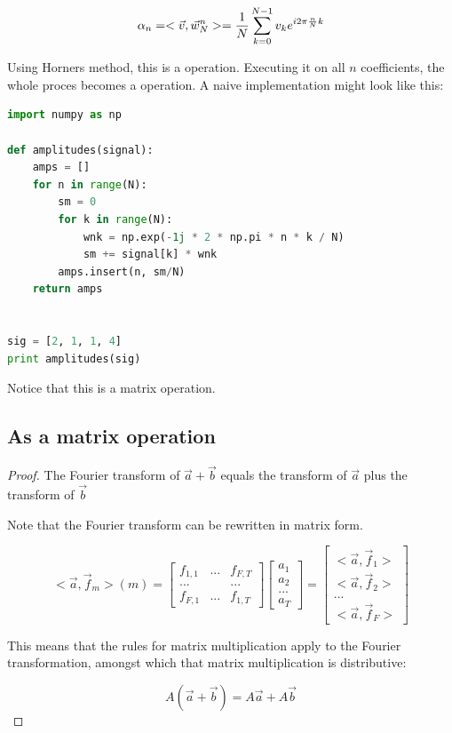 $$ \alpha_n = < \vec{v} , \vec{w}_N^n > = \frac{1}{N} \sum_{k=0}^{N-1} v_k e^{i 2\pi \frac{n}{N} k} $$

Using Horners method, this is a  operation. Executing it on all $n$ coefficients, the whole proces becomes a  operation. A naive implementation might look like this: 

\begin{lstlisting}[language=python]
import numpy as np

def amplitudes(signal):
    amps = []
    for n in range(N):
        sm = 0
        for k in range(N):
            wnk = np.exp(-1j * 2 * np.pi * n * k / N) 
            sm += signal[k] * wnk
        amps.insert(n, sm/N)
    return amps


sig = [2, 1, 1, 4]
print amplitudes(sig)
\end{lstlisting}

Notice that this is a matrix operation. 


\subsection{As a matrix operation}

\begin{proof}
    The Fourier transform of $\vec{a} + \vec{b}$ equals the transform of $\vec{a}$ plus the transform of $\vec{b}$

    Note that the Fourier transform can be rewritten in matrix form. 
    
    $$
    <\vec{a}, \vec{f}_m>(m) = 
    \begin{bmatrix} f_{1,1} & ... & f_{F,T} \\ ... & & ... \\ f_{F,1} & ... & f_{1,T}  \end{bmatrix} 
    \begin{bmatrix} a_1 \\ a_2 \\ ... \\ a_T \end{bmatrix}  
    = 
    \begin{bmatrix} <\vec{a}, \vec{f}_1> \\ <\vec{a}, \vec{f}_2> \\ ...  \\ <\vec{a}, \vec{f}_F> \end{bmatrix} 
    $$
    
    This means that the rules for matrix multiplication apply to the Fourier transformation, amongst which that matrix multiplication is distributive:
    
    $$ A (\vec{a} + \vec{b}) = A \vec{a} + A \vec{b} $$
    
    
\end{proof}


